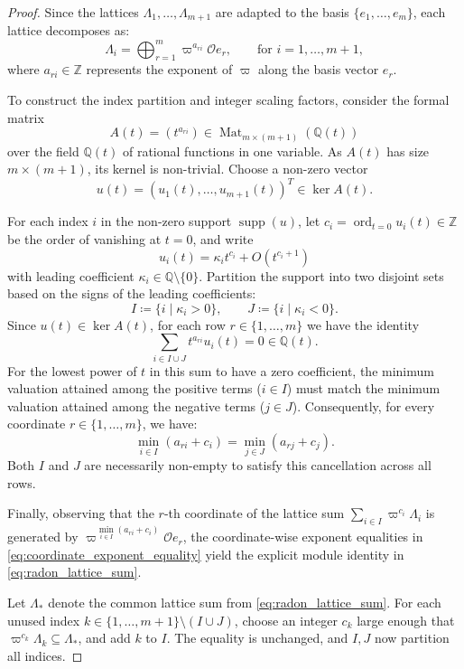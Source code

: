 \documentclass[12pt]{amsart}
\theoremstyle{definition}
\theoremstyle{remark}
\begin{document}
\begin{proof}
Since the lattices $\Lambda_1, \ldots, \Lambda_{m+1}$ are adapted to the basis $\{e_1, \ldots, e_m\}$, each lattice decomposes as:
\[
    \Lambda_i = \bigoplus_{r=1}^m \varpi^{a_{ri}} \mathcal{O} e_r, \qquad \text{for } i = 1, \ldots, m+1,
\]
where $a_{ri} \in \mathbb{Z}$ represents the exponent of $\varpi$ along the basis vector $e_r$.

To construct the index partition and integer scaling factors, consider the formal matrix 
\[
A(t) = (t^{a_{ri}}) \in \operatorname{Mat}_{m \times (m+1)}(\mathbb{Q}(t))
\]
over the  field $\mathbb{Q}(t)$ of rational functions in one variable. As $A(t)$ has size $m \times (m+1)$, its kernel is non-trivial. Choose a non-zero vector 
\[
u(t) = (u_1(t), \ldots, u_{m+1}(t))^T \in \ker A(t).
\]

For each index $i$ in the non-zero support $\operatorname{supp}(u)$, let $c_i = \operatorname{ord}_{t=0} u_i(t) \in \mathbb{Z}$ be the order of vanishing at $t=0$, and write 
\[
u_i(t) = \kappa_i t^{c_i} + O(t^{c_i+1})
\]
with leading coefficient $\kappa_i \in \mathbb{Q} \setminus \{0\}$. Partition the support into two disjoint sets based on the signs of the leading coefficients:
\[
    I \coloneqq \{ i \mid \kappa_i > 0 \}, \qquad J \coloneqq \{ i \mid \kappa_i < 0 \}.
\]
Since $u(t) \in \ker A(t)$, for each row $r \in \{1, \ldots, m\}$ we have the identity
\[
    \sum_{i \in I \cup J} t^{a_{ri}} u_i(t) = 0 \in \mathbb{Q}(t).
\]
For the lowest power of $t$ in this sum to have a zero coefficient, the minimum valuation attained among the positive terms ($i \in I$) must match the minimum valuation attained among the negative terms ($j \in J$). Consequently, for every coordinate $r \in \{1, \ldots, m\}$, we have:
\begin{equation}
\label{eq:coordinate_exponent_equality}
    \min_{i \in I} (a_{ri} + c_i) = \min_{j \in J} (a_{rj} + c_j).
\end{equation}
Both $I$ and $J$ are necessarily non-empty to satisfy this cancellation across all rows.

Finally, observing that the $r$-th coordinate of the lattice sum $\sum\limits_{i \in I} \varpi^{c_i} \Lambda_i$ is generated by $\varpi^{\min\limits_{i \in I} (a_{ri} + c_i)} \mathcal{O} e_r$, the coordinate-wise exponent equalities in \eqref{eq:coordinate_exponent_equality} yield the explicit module identity in \eqref{eq:radon_lattice_sum}.

Let $\Lambda_*$ denote the common lattice sum from \eqref{eq:radon_lattice_sum}. For each unused index $k\in\{1,\ldots,m+1\}\setminus(I\cup J)$, choose an
integer $c_k$ large enough that $\varpi^{c_k}\Lambda_k
\subseteq\Lambda_*$, and add $k$ to $I$. The equality is unchanged, and $I,J$ now partition all indices.
\end{proof}
\end{document}
